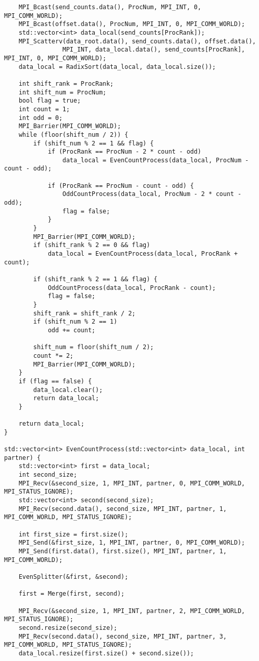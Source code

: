 \documentclass[12pt]{report}
\begin{document}
\begin{lstlisting}
    MPI_Bcast(send_counts.data(), ProcNum, MPI_INT, 0, MPI_COMM_WORLD);
    MPI_Bcast(offset.data(), ProcNum, MPI_INT, 0, MPI_COMM_WORLD);
    std::vector<int> data_local(send_counts[ProcRank]);
    MPI_Scatterv(data_root.data(), send_counts.data(), offset.data(),
                MPI_INT, data_local.data(), send_counts[ProcRank], MPI_INT, 0, MPI_COMM_WORLD);
    data_local = RadixSort(data_local, data_local.size());

    int shift_rank = ProcRank;
    int shift_num = ProcNum;
    bool flag = true;
    int count = 1;
    int odd = 0;
    MPI_Barrier(MPI_COMM_WORLD);
    while (floor(shift_num / 2)) {
        if (shift_num % 2 == 1 && flag) {
            if (ProcRank == ProcNum - 2 * count - odd)
                data_local = EvenCountProcess(data_local, ProcNum - count - odd);

            if (ProcRank == ProcNum - count - odd) {
                OddCountProcess(data_local, ProcNum - 2 * count - odd);
                flag = false;
            }
        }
        MPI_Barrier(MPI_COMM_WORLD);
        if (shift_rank % 2 == 0 && flag)
            data_local = EvenCountProcess(data_local, ProcRank + count);

        if (shift_rank % 2 == 1 && flag) {
            OddCountProcess(data_local, ProcRank - count);
            flag = false;
        }
        shift_rank = shift_rank / 2;
        if (shift_num % 2 == 1)
            odd += count;

        shift_num = floor(shift_num / 2);
        count *= 2;
        MPI_Barrier(MPI_COMM_WORLD);
    }
    if (flag == false) {
        data_local.clear();
        return data_local;
    }

    return data_local;
}

std::vector<int> EvenCountProcess(std::vector<int> data_local, int partner) {
    std::vector<int> first = data_local;
    int second_size;
    MPI_Recv(&second_size, 1, MPI_INT, partner, 0, MPI_COMM_WORLD, MPI_STATUS_IGNORE);
    std::vector<int> second(second_size);
    MPI_Recv(second.data(), second_size, MPI_INT, partner, 1, MPI_COMM_WORLD, MPI_STATUS_IGNORE);

    int first_size = first.size();
    MPI_Send(&first_size, 1, MPI_INT, partner, 0, MPI_COMM_WORLD);
    MPI_Send(first.data(), first.size(), MPI_INT, partner, 1, MPI_COMM_WORLD);

    EvenSplitter(&first, &second);

    first = Merge(first, second);

    MPI_Recv(&second_size, 1, MPI_INT, partner, 2, MPI_COMM_WORLD, MPI_STATUS_IGNORE);
    second.resize(second_size);
    MPI_Recv(second.data(), second_size, MPI_INT, partner, 3, MPI_COMM_WORLD, MPI_STATUS_IGNORE);
    data_local.resize(first.size() + second.size());


\end{lstlisting}
\end{document}
